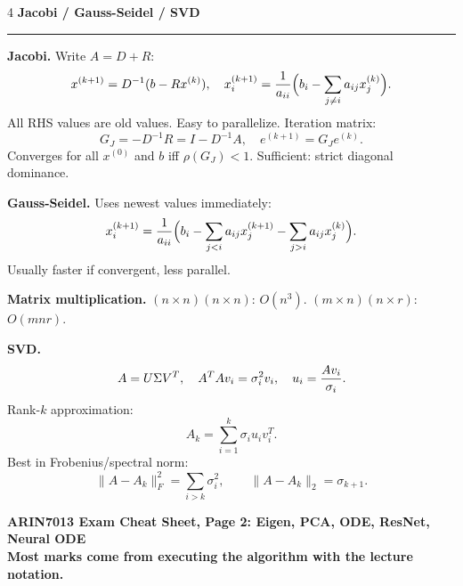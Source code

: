 \documentclass[10pt,a4paper,landscape]{article}
\newcommand{\topic}[1]{\vspace{2pt}\textbf{\large #1}\par\hrule\vspace{2pt}}
\newcommand{\subtopic}[1]{\textbf{#1.}}
\begin{document}
\begin{multicols*}{4}
\topic{Jacobi / Gauss-Seidel / SVD}
\subtopic{Jacobi}
Write $A=D+R$:
\[
x^{(k+1)}=D^{-1}(b-Rx^{(k)}),\quad
x_i^{(k+1)}={1\over a_{ii}}\Big(b_i-\sum_{j\ne i}a_{ij}x_j^{(k)}\Big).
\]
All RHS values are old values. Easy to parallelize.
Iteration matrix:
\[
G_J=-D^{-1}R=I-D^{-1}A,\quad e^{(k+1)}=G_Je^{(k)}.
\]
Converges for all $x^{(0)}$ and $b$ iff $\rho(G_J)<1$. Sufficient: strict diagonal dominance.

\subtopic{Gauss-Seidel}
Uses newest values immediately:
\[
x_i^{(k+1)}={1\over a_{ii}}\Big(b_i-\sum_{j<i}a_{ij}x_j^{(k+1)}
-\sum_{j>i}a_{ij}x_j^{(k)}\Big).
\]
Usually faster if convergent, less parallel.

\subtopic{Matrix multiplication}
$(n\times n)(n\times n)$: $O(n^3)$. $(m\times n)(n\times r)$: $O(mnr)$.

\subtopic{SVD}
\[
A=U\Sigma V^T,\quad A^TA v_i=\sigma_i^2 v_i,\quad u_i={Av_i\over \sigma_i}.
\]
Rank-$k$ approximation:
\[
A_k=\sum_{i=1}^k\sigma_i u_iv_i^T.
\]
Best in Frobenius/spectral norm:
\[
\|A-A_k\|_F^2=\sum_{i>k}\sigma_i^2,\qquad
\|A-A_k\|_2=\sigma_{k+1}.
\]

\end{multicols*}
\newpage

\begin{center}
{\Large \textbf{ARIN7013 Exam Cheat Sheet, Page 2: Eigen, PCA, ODE, ResNet, Neural ODE}}\\[-1mm]
\textbf{Most marks come from executing the algorithm with the lecture notation.}
\end{center}
\end{document}

